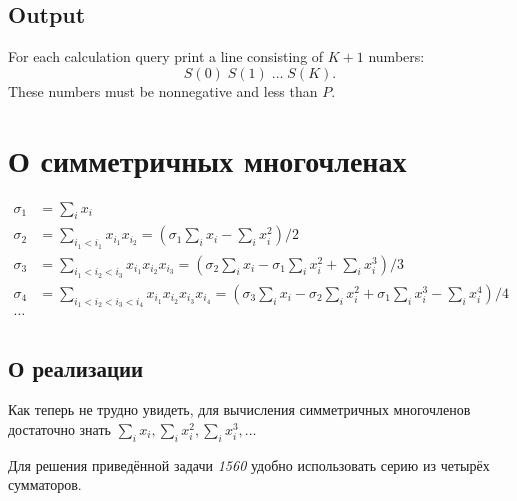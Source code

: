 \documentclass[draft]{article}
\begin{document}
\subsection{Output}

For each calculation query print a line consisting of $K + 1$ numbers:
\[ S(0) \; S(1) \; \ldots \; S(K). \]
These numbers must be nonnegative and less than $P$.

\Rus

\section{О симметричных многочленах} 

\begin{align*}
\sigma_1 & = \sum_{i} {x_i} \\
\sigma_2 & = \sum_{i_1 < i_1} {x_{i_1} x_{i_2}} = (\sigma_1 \sum_{i} {x_i} - \sum_{i} {x_i^2}) / 2 \\
\sigma_3 & = \sum_{i_1 < i_2 < i_3} { x_{i_1} x_{i_2} x_{i_3} } = (\sigma_2 \sum_{i} {x_i} - \sigma_1 \sum_{i} {x_i^2} + \sum_{i} {x_i^3}) / 3 \\
\sigma_4 & = \sum_{i_1 < i_2 < i_3 < i_4} { x_{i_1} x_{i_2} x_{i_3} x_{i_4} } = (\sigma_3 \sum_{i} {x_i} - \sigma_2 \sum_{i} {x_i^2} + \sigma_1 \sum_{i} {x_i^3} - \sum_{i} {x_i^4}) / 4 \\
\ldots\\
\end{align*}

\subsection{О реализации}

Как теперь не трудно увидеть, для вычисления симметричных многочленов достаточно знать $\sum_{i} {x_i}, \sum_{i} {x_i^2}, \sum_{i} {x_i^3}, \ldots$

Для решения приведённой задачи {\it 1560} удобно использовать серию из четырёх сумматоров.
\end{document}
